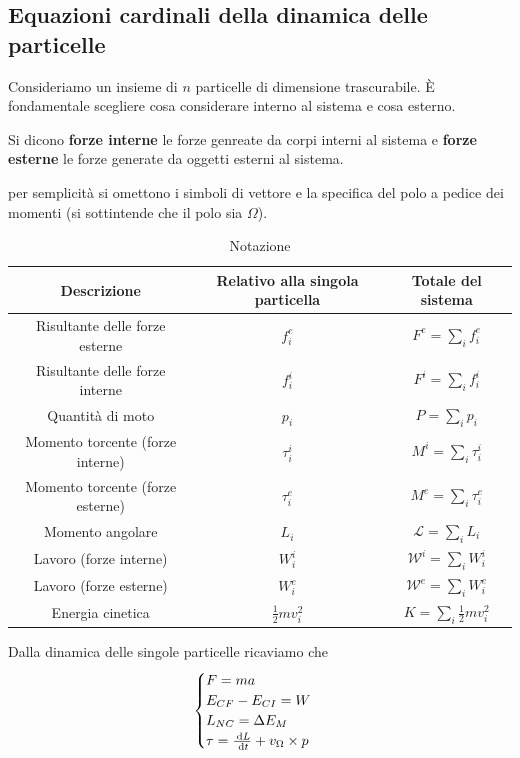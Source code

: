 \documentclass{article}
\theoremstyle{plain}
\begin{document}
\subsection{Equazioni cardinali della dinamica delle particelle}
Consideriamo  un insieme di $n$ particelle di dimensione trascurabile. È fondamentale scegliere cosa considerare interno al sistema e cosa esterno.
\begin{boxdef}
    Si dicono \textbf{forze interne} le forze genreate da corpi interni al sistema e \textbf{forze esterne} le forze generate da oggetti esterni al sistema.
\end{boxdef}
per semplicità si omettono i simboli di vettore e la specifica del polo a pedice dei momenti (si sottintende che il polo sia $\Omega$).
\begin{table}[h]
    \centering
    \everymath{\scriptstyle}
    \begin{tabular}[h]{|c|c|c|}
        \hline
        \textbf{Descrizione}&\textbf{Relativo alla singola particella}& \textbf{Totale del sistema}\\\hline
        Risultante delle forze esterne & $f^e_i$ & $F^e= \sum_if^e_i$\\
        Risultante delle forze interne & $f^i_i$ & $F^i = \sum_i f^i_i$\\
        Quantità di moto & $p_i$ & $P = \sum_i p_i$ \\
        Momento torcente (forze interne)& $\tau_i^i$ & $M^i = \sum_i \tau_i^i$\\
        Momento torcente (forze esterne)& $\tau_i^e$ & $M^e = \sum_i \tau_i^e$\\
        Momento angolare & $L_i $ & $\mathcal{L}= \sum_iL_i$\\
        Lavoro (forze interne) & $W_i^i$ & $\mathcal{W}^i = \sum_i W_i^i$\\
        Lavoro (forze esterne) & $W_i^e$ & $\mathcal{W}^e = \sum_i W_i^e$\\
        Energia cinetica & $ \frac{1}{2}mv^2_i$  & $K=\sum_i \frac{1}{2}mv^2_i$\\
        \hline
    \end{tabular}
    \caption{Notazione}
\end{table}
Dalla dinamica delle singole particelle ricaviamo che 
\[\begin{cases} 
    F = ma\\
    E_{CF} - E_{CI} = W\\
    L_{NC} = \Delta E_M\\
    \tau = \frac{\:\text{d} L}{\:\text{d} t} + v_\Omega \times p 
\end{cases} \]
\end{document}
